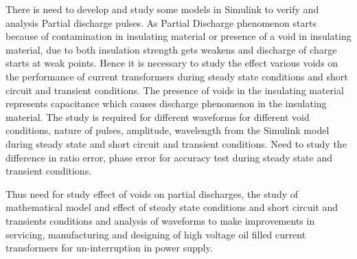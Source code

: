 There is need to develop and study some models in Simulink to verify and analysis Partial discharge pulses. As Partial Discharge phenomenon starts because of contamination in insulating material or presence of a void in insulating material, due to both insulation strength gets weakens and discharge of charge starts at weak points. Hence it is necessary to study the effect various voids on the performance of current transformers during steady state conditions and short circuit and transient conditions. The presence of voids in the insulating material represents capacitance which causes discharge phenomenon in the insulating material. The study is required for different waveforms for different void conditions, nature of pulses, amplitude, wavelength from the Simulink model during steady state and short circuit and transient conditions. Need to study the difference in ratio error, phase error for accuracy test during steady state and transient conditions.

Thus need for study effect of voids on partial discharges, the study of mathematical model and effect of steady state conditions and short circuit and transients conditions and analysis of waveforms to make improvements in servicing, manufacturing and designing of high voltage oil filled current transformers for un-interruption in power supply.
\setlength{\parskip}{0em}